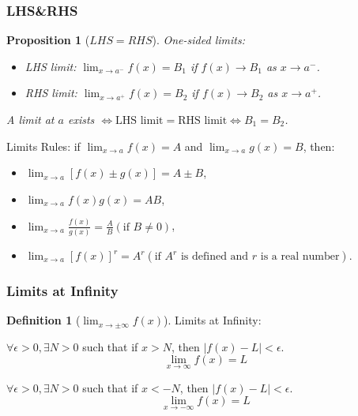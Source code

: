 \documentclass{amsproc}
\newtheorem{proposition}[theorem]{Proposition}
\theoremstyle{definition}
\newtheorem{definition}[theorem]{Definition}
\theoremstyle{remark}
\numberwithin{equation}{section}
\begin{document}
\subsubsection{LHS\&RHS}

\begin{proposition}[$LHS=RHS$]
    One-sided limits:
    \begin{itemize}
        \item LHS limit: $\lim_{x \to a^-} f(x)=B_1$ if $f(x) \to B_1$ as $x \to a^-$.
        \item RHS limit: $\lim_{x \to a^+} f(x)=B_2$ if $f(x) \to B_2$ as $x \to a^+$.
    \end{itemize}

    A limit at $a$ exists $\iff \text{LHS limit} = \text{RHS limit} \iff B_1=B_2$.
\end{proposition}

Limits Rules: if $\lim_{x \to a}f(x)=A $ and $\lim_{x \to a}g(x)=B $, then:
\begin{itemize}
    \item $\lim_{x \to a}[f(x) \pm g(x)] = A \pm B $,
    \item $\lim_{x \to a} f(x)g(x) = AB $,
    \item $\lim_{x \to a}\frac{f(x)}{g(x)} = \frac{A}{B} (\text{if } B \neq 0) $,
    \item $\lim_{x \to a} [f(x)]^r = A^r(\text{if $A^r$ is defined and $r$ is a real number})$.
\end{itemize}

\subsubsection{Limits at Infinity}

\begin{definition}[$\lim_{x \to \pm\infty} f(x)$]Limits at Infinity:

    $\forall \epsilon > 0, \exists N > 0$ such that if $x > N$, then $|f(x) - L|< \epsilon$.
    \begin{equation*}
        \lim_{x \to \infty} f(x) = L
    \end{equation*}

    $\forall \epsilon > 0, \exists N > 0$ such that if $x < -N$, then $|f(x) - L|< \epsilon$.
    \begin{equation*}
        \lim_{x \to -\infty} f(x) = L
    \end{equation*}
\end{definition}
\end{document}
